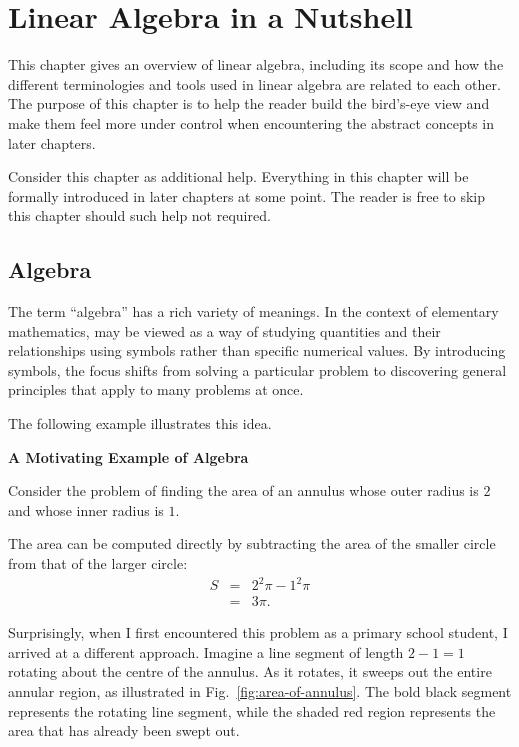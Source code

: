 \chapter{Linear Algebra in a Nutshell}

This chapter gives an overview of linear algebra, including its scope and how the different terminologies and tools used in linear algebra are related to each other. The purpose of this chapter is to help the reader build the bird's-eye view and make them feel more under control when encountering the abstract concepts in later chapters.

Consider this chapter as additional help. Everything in this chapter will be formally introduced in later chapters at some point. The reader is free to skip this chapter should such help not required.

\section{Algebra}

The term ``algebra'' has a rich variety of meanings. In the context of elementary mathematics,  may be viewed as a way of studying quantities and their relationships using symbols rather than specific numerical values. By introducing symbols, the focus shifts from solving a particular problem to discovering general principles that apply to many problems at once.

The following example illustrates this idea.

\begin{mdframed}
	\noindent \textbf{A Motivating Example of Algebra}
	
	Consider the problem of finding the area of an annulus whose outer radius is $2$ and whose inner radius is $1$.
	
\end{mdframed}

The area can be computed directly by subtracting the area of the smaller circle from that of the larger circle:
\begin{eqnarray}
	S &=& 2^2\pi - 1^2\pi \nonumber \\
	&=& 3\pi. \nonumber
\end{eqnarray}

Surprisingly, when I first encountered this problem as a primary school student, I arrived at a different approach. Imagine a line segment of length $2-1=1$ rotating about the centre of the annulus. As it rotates, it sweeps out the entire annular region, as illustrated in Fig.~\ref{fig:area-of-annulus}. The bold black segment represents the rotating line segment, while the shaded red region represents the area that has already been swept out.

